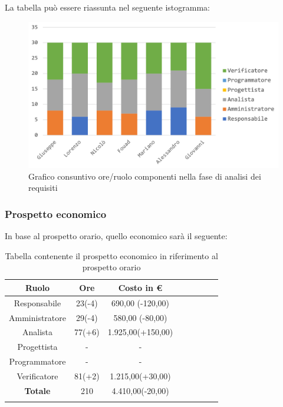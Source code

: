 			La tabella può essere riassunta nel seguente istogramma:
			
			\begin{figure}[H]
				\centering
				\includegraphics[width=0.8\linewidth]{images/consuntivo/analisiCons1.png}
				\caption{Grafico consuntivo ore/ruolo componenti nella fase di analisi dei requisiti}
				\label{fig:consuntivo grafico suddivione ruoli fase analisi dei requisiti}
			\end{figure}
			
		\subsubsection{Prospetto economico}
			In base al prospetto orario, quello economico sarà il seguente: 
			
			\begin{longtable}{|c|c|c|c|c|c|c|c}
				\hline
				\rowcolor{lighter-grayer}
				\textbf{Ruolo} & \textbf{Ore} & \textbf{Costo in €} \\
				\hline
				\endfirsthead
				
				\hline
				Responsabile & 23(-4) & 690,00 (-120,00)\\
				\hline
				\hline
				Amministratore & 29(-4) & 580,00 (-80,00)\\
				\hline
				\hline
				Analista & 77(+6) & 1.925,00(+150,00)\\
				\hline
				\hline
				Progettista & - & -\\
				\hline
				\hline
				Programmatore & - & -\\
				\hline
				\hline
				Verificatore & 81(+2) & 1.215,00(+30,00)\\
				\hline
				\textbf{Totale} & 210 & 4.410,00(-20,00)\\
				\hline
				\caption{Tabella contenente il prospetto economico in riferimento al prospetto orario}
			\end{longtable}
			\pagebreak
			
